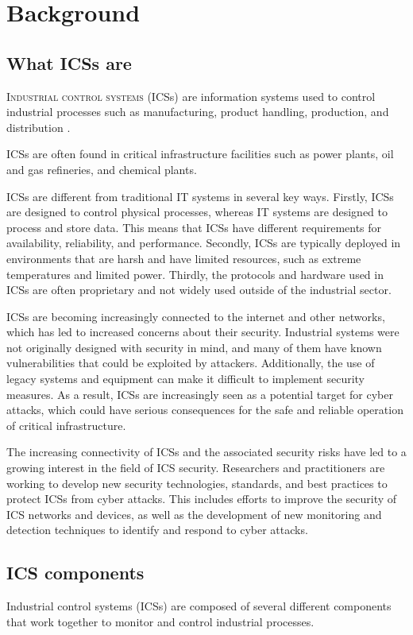 \chapter{Background}
\label{background}

\section{What ICSs are}
\lettrine[lines=2]{I}{ndustrial control systems} (ICSs) are information systems used to control industrial processes such as manufacturing, product handling, production, and distribution \cite{ics_definition}.

ICSs are often found in critical infrastructure facilities such as power plants, oil and gas refineries, and chemical plants.

\bigskip
ICSs are different from traditional IT systems in several key ways. Firstly, ICSs are designed to control physical processes, whereas IT systems are designed to process and store data. This means that ICSs have different requirements for availability, reliability, and performance. Secondly, ICSs are typically deployed in environments that are harsh and have limited resources, such as extreme temperatures and limited power. Thirdly, the protocols and hardware used in ICSs are often proprietary and not widely used outside of the industrial sector.

\bigskip
ICSs are becoming increasingly connected to the internet and other networks, which has led to increased concerns about their security. Industrial systems were not originally designed with security in mind, and many of them have known vulnerabilities that could be exploited by attackers. Additionally, the use of legacy systems and equipment can make it difficult to implement security measures. As a result, ICSs are increasingly seen as a potential target for cyber attacks, which could have serious consequences for the safe and reliable operation of critical infrastructure.

\bigskip
The increasing connectivity of ICSs and the associated security risks have led to a growing interest in the field of ICS security. Researchers and practitioners are working to develop new security technologies, standards, and best practices to protect ICSs from cyber attacks. This includes efforts to improve the security of ICS networks and devices, as well as the development of new monitoring and detection techniques to identify and respond to cyber attacks.

\section{ICS components}
\label{sec:ics_components}
Industrial control systems (ICSs) are composed of several different components that work together to monitor and control industrial processes. 

